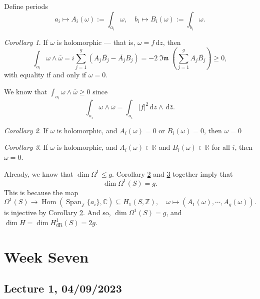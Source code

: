 \documentclass[a4paper]{report}
\theoremstyle{definition}
\theoremstyle{remark}
\theoremstyle{proposition}
\theoremstyle{conjecture}
\theoremstyle{lemma}
\theoremstyle{corollary}
\newtheorem{corollary}{Corollary}
\theoremstyle{exercise}
\theoremstyle{example}
\newcommand{\C}{\mathbb{C}}
\newcommand{\diff}{\,\mathrm{d}}
\newcommand{\on}{\operatorname}
\begin{document}
Define periods 
$$a_i\longmapsto A_i(\omega) := \int_{a_i}\omega,\quad b_i\longmapsto B_i(\omega):=\int_{b_i} \omega.$$

\begin{corollary}
    If $\omega$ is holomorphic --- that is, $\omega = f\diff z$, then 
    $$\int_{a_i} \omega\wedge \overline{\omega} = i\sum_{j=1}^g \left( A_j\overline{B_j} - \overline{A_j}B_j\right) = -2 \on{\mathfrak{Im}}\left(\sum_{j=1}^g A_j\overline{B_j}\right) \geq 0,$$
    with equality if and only if $\omega = 0$.
\end{corollary}

We know that $\int_{a_i}\omega\wedge \overline{\omega}\geq 0$
since $$\int_{a_i}\omega \wedge \overline{\omega} = \int_{a_i}\vert f\vert^2\diff z \wedge \diff \bar{z}.$$

\begin{corollary}\label{cor15}
    If $\omega$ is holomorphic, and $A_i(\omega) = 0$ or $B_i(\omega)=0$, then $\omega =0$
\end{corollary}

\begin{corollary}\label{cor16}
    If $\omega$ is holomorphic, and $A_i(\omega)\in\mathbb{R}$ and 
    $B_i(\omega)\in\mathbb{R}$ for all $i$, then $\omega = 0$.
\end{corollary}

Already, we know that $\dim\Omega^1 \leq g$.
Corollary \ref{cor15} and \ref{cor16} together imply that 
$$\dim\Omega^1(S) =g.$$
This is because the map $$\Omega^1(S) \longrightarrow \on{Hom}(\on{Span}_{\mathbb{Z}}\lbrace a_i\rbrace,\C) \subseteq H_1(S,\mathbb{Z}),\quad \omega \longmapsto (A_1(\omega),\cdots,A_g(\omega)).$$
is injective by Corollary \ref{cor15}. And so, 
$\dim \Omega^1(S) = g$, and $\dim H = \dim H^1_{\on{dR}}(S) = 2g$.

\chapter{Week Seven}

\section{Lecture 1, 04/09/2023}
\end{document}
